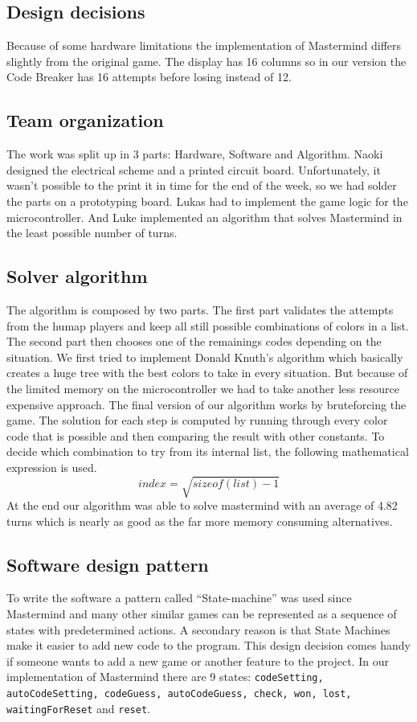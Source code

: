 \documentclass[a4paper, 12pt]{article}
\begin{document}
\subsection{Design decisions}
Because of some hardware limitations the implementation of Mastermind differs
slightly from the original game. The display has 16 columns so in our version
the Code Breaker has 16 attempts before losing instead of 12.

\subsection{Team organization}
The work was split up in 3 parts: Hardware, Software and Algorithm.
Naoki designed the electrical scheme and a printed circuit board.
Unfortunately, it wasn’t possible to the print it in time for the end of
the week, so we had solder the parts on a prototyping board. Lukas had
to implement the game logic for the microcontroller. And Luke
implemented an algorithm that solves Mastermind in the least possible
number of turns. 

\subsection{Solver algorithm}
The algorithm is composed by two parts. The first part validates the attempts
from the humap players and keep all still possible combinations of colors in a
list. The second part then chooses one of the remainings codes depending on
the situation. We first tried to implement Donald Knuth's algorithm
\cite{knuth} which basically creates a huge tree with the best colors to take
in every situation. But because of the limited memory on the microcontroller
we had to take another less resource expensive approach.  The final version of
our algorithm works by bruteforcing the game. The solution for each step is
computed by running through every color code that is possible and then
comparing the result with other constants.  To decide which combination to try
from its internal list, the following mathematical expression is used.  $$
index = \sqrt{sizeof(list) -1} $$ At the end our algorithm was able to solve
mastermind with an average of 4.82 turns which is nearly as good as the far
more memory consuming alternatives.

\subsection{Software design pattern}
To write the software a pattern called “State-machine” \cite{wikistatepattern}\cite{wikistatemachine} was used
since Mastermind and many other similar games can be represented as a
sequence of states with predetermined actions. A secondary reason is
that State Machines make it easier to add new code to the program. This
design decision comes handy if someone wants to add a new game or
another feature to the project. In our implementation of Mastermind
there are 9 states: {\tt codeSetting, autoCodeSetting, codeGuess,
autoCodeGuess, check,  won, lost, waitingForReset} and {\tt reset}.
\end{document}
